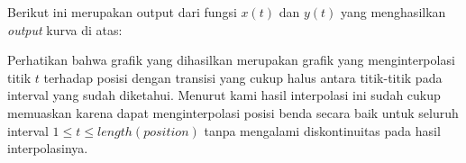 \documentclass[journal,12pt,onecolumn,a4paper]{IEEEtran}
\begin{document}
Berikut ini merupakan output dari fungsi \(x(t)\) dan \(y(t)\) yang menghasilkan \emph{output} kurva di atas:
Perhatikan bahwa grafik yang dihasilkan merupakan grafik yang menginterpolasi titik \(t\) terhadap posisi dengan transisi yang cukup halus antara titik-titik pada interval yang sudah diketahui. Menurut kami hasil interpolasi ini sudah cukup memuaskan karena dapat menginterpolasi posisi benda secara baik untuk seluruh interval \(1 \leq t \leq length(position)\) tanpa mengalami diskontinuitas pada hasil interpolasinya.
\end{document}
